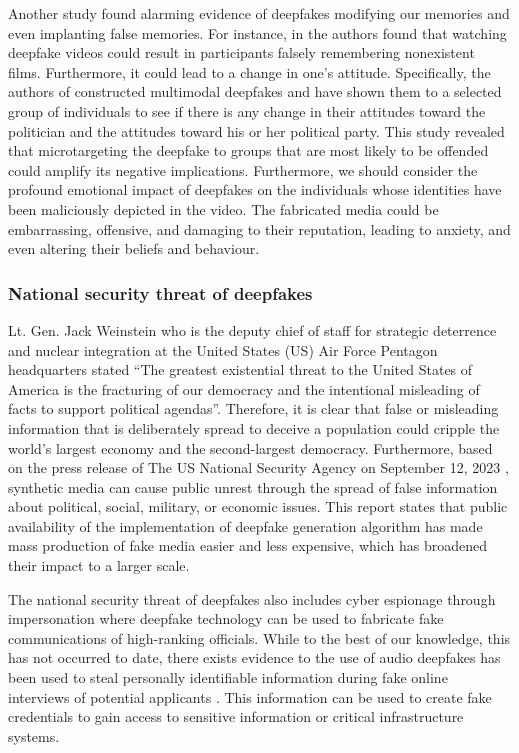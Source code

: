 Another study found alarming evidence of deepfakes modifying our memories and even implanting false memories. For instance, in \cite{dobber2021microtargeted} the authors found that watching deepfake videos could result in participants falsely remembering nonexistent films. Furthermore, it could lead to a change in one's attitude. Specifically, the authors of \cite{dobber2021microtargeted} constructed multimodal deepfakes and have shown them to a selected group of individuals to see if there is any change in their attitudes toward the politician and the attitudes toward his or her political party. This study revealed that microtargeting the deepfake to groups that are most likely to be offended could amplify its negative implications.   Furthermore, we should consider the profound emotional impact of deepfakes on the individuals whose identities have been maliciously depicted in the video. The fabricated media could be embarrassing, offensive, and damaging to their reputation, leading to anxiety, and even altering their beliefs and behaviour.

\subsubsection{National security threat of deepfakes} 

Lt. Gen. Jack Weinstein who is the deputy chief of staff for strategic deterrence and nuclear integration at the United States (US) Air Force Pentagon headquarters stated ``The greatest existential threat to the United States of America is the fracturing of our democracy and the intentional misleading of facts to support political agendas''. Therefore, it is clear that false or misleading information that is deliberately spread to deceive a population could cripple the world's largest economy and the second-largest democracy. Furthermore, based on the press release of The US National Security Agency on September 12, 2023 \cite{deepfakeNSA}, synthetic media can cause public unrest through the spread of false information about political, social, military, or economic issues. This report states that public availability of the implementation of deepfake generation algorithm has made mass production of fake media easier and less expensive, which has broadened their impact to a larger scale.  

The national security threat of deepfakes also includes cyber espionage through impersonation where deepfake technology can be used to fabricate fake communications of high-ranking officials. While to the best of our knowledge, this has not occurred to date, there exists evidence to the use of audio deepfakes has been used to steal personally identifiable information during fake online interviews of potential applicants \cite{deepfakeFBI}. This information can be used to create fake credentials to gain access to sensitive information or critical infrastructure systems. 

